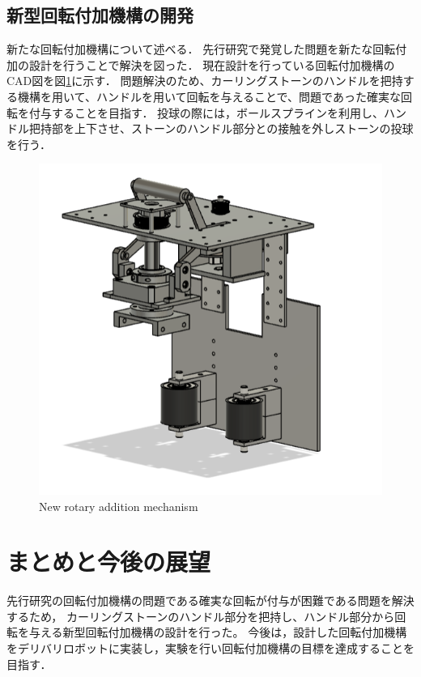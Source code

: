 \documentclass{classes/sice-si}
\begin{document}
\subsection{新型回転付加機構の開発}
新たな回転付加機構について述べる．
先行研究で発覚した問題を新たな回転付加の設計を行うことで解決を図った．
現在設計を行っている回転付加機構のCAD図を図\ref{fig:new}に示す．
問題解決のため、カーリングストーンのハンドルを把持する機構を用いて、ハンドルを用いて回転を与えることで、問題であった確実な回転を付与することを目指す．
投球の際には，ボールスプラインを利用し、ハンドル把持部を上下させ、ストーンのハンドル部分との接触を外しストーンの投球を行う．
\begin{figure}[H]
    \centering
    \begin{minipage}{0.6\linewidth}
        \includegraphics[width=\linewidth]{figures/4.png}
        \caption{New rotary addition mechanism}
        \label{fig:new}
    \end{minipage}
    \hfill
    \vspace{0pt} %
\end{figure}



\section{まとめと今後の展望}
先行研究の回転付加機構の問題である確実な回転が付与が困難である問題を解決するため，
カーリングストーンのハンドル部分を把持し、ハンドル部分から回転を与える新型回転付加機構の設計を行った。
今後は，設計した回転付加機構をデリバリロボットに実装し，実験を行い回転付加機構の目標を達成することを目指す．



\printbibliography[title=参考文献]
\end{document}
